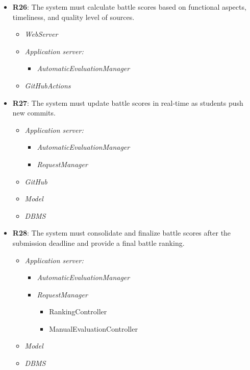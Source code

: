 \begin{itemize}
        \item \textbf{R26}: The system must calculate battle scores based on functional aspects, timeliness, and quality level of sources.
              \begin{itemize}
             \item \textit{WebServer}
            \item \textit{Application server:}
            \begin{itemize}
                 \item \textit{AutomaticEvaluationManager}
            \end{itemize}
            \item \textit{GitHubActions}
                \end{itemize}

         \item \textbf{R27}: The system must update battle scores in real-time as students push new commits.
           \begin{itemize}
            \item \textit{Application server:}
            \begin{itemize}
                 \item \textit{AutomaticEvaluationManager}
                 \item \textit{RequestManager} \begin{itemize}
                 \end{itemize}
            \end{itemize}
            \item \textit{GitHub}
            \item \textit{Model}
             \item \textit{DBMS}
                \end{itemize}
         \item \textbf{R28}: The system must consolidate and finalize battle scores after the submission deadline and provide a final battle ranking.
          \begin{itemize}
            \item \textit{Application server:}
            \begin{itemize}
                 \item \textit{AutomaticEvaluationManager}
                 \item \textit{RequestManager} \begin{itemize}
                     \item RankingController
                     \item ManualEvaluationController
                 \end{itemize}
            \end{itemize}
            \item \textit{Model}
            \item \textit{DBMS}
                \end{itemize}



\end{itemize}
